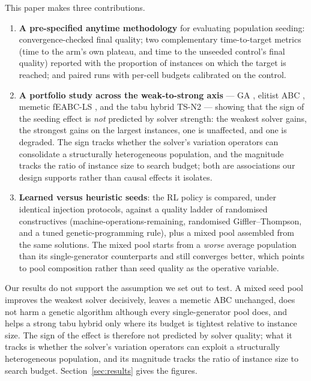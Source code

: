 \documentclass[review]{elsarticle}
\begin{document}
This paper makes three contributions.
\begin{enumerate}
\item \textbf{A pre-specified anytime methodology} for evaluating
  population seeding: convergence-checked final quality; two complementary
  time-to-target metrics (time to the arm's own plateau, and time to the
  unseeded control's final quality) reported with the proportion of
  instances on which the target is reached; and paired runs with per-cell
  budgets calibrated on the control.
\item \textbf{A portfolio study across the weak-to-strong axis} --- GA
  \cite{DiazIPMU2020}, elitist ABC \cite{DiazIWINAC2022}, memetic fEABC-LS
  \cite{DiazNatComp2023}, and the tabu hybrid TS-N2 \cite{DiazTSN2} ---
  showing that the sign of the seeding effect is \emph{not} predicted by
  solver strength: the weakest solver gains, the strongest gains on the
  largest instances, one is unaffected, and one is degraded. The sign
  tracks whether the solver's variation operators can consolidate a
  structurally heterogeneous population, and the magnitude tracks the
  ratio of instance size to search budget; both are associations our
  design supports rather than causal effects it isolates.
\item \textbf{Learned versus heuristic seeds}: the RL policy is compared,
  under identical injection protocols, against a quality ladder of
  randomised constructives (machine-operations-remaining, randomised
  Giffler--Thompson, and a tuned genetic-programming rule), plus a mixed
  pool assembled from the same solutions. The mixed pool starts from a
  \emph{worse} average population than its single-generator counterparts
  and still converges better, which points to pool composition rather than
  seed quality as the operative variable.
\end{enumerate}

Our results do not support the assumption we set out to test. A mixed seed
pool improves the weakest solver decisively, leaves a memetic ABC
unchanged, does not harm a genetic algorithm although every
single-generator pool does, and helps a strong tabu hybrid only where its
budget is tightest relative to instance size. The sign of the effect is
therefore not predicted by solver quality; what it tracks is whether the
solver's variation operators can exploit a structurally heterogeneous
population, and its magnitude tracks the ratio of instance size to search
budget. Section~\ref{sec:results} gives the figures.
\end{document}
